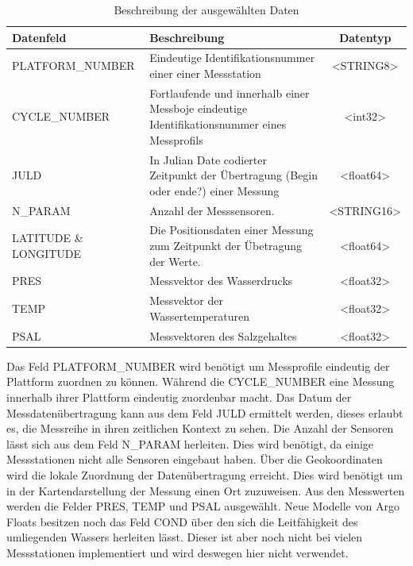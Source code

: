 \begin{center}
\begin{table}
  
  \begin{tabular}{ | l | p{7cm}| c |}
    \hline
    \textbf{Datenfeld} & \textbf{Beschreibung} & \textbf{Datentyp} \\\hline
   
    PLATFORM\_NUMBER 
        &  Eindeutige Identifikationsnummer einer einer Messstation
        & <STRING8>
        \\\hline 
    
    CYCLE\_NUMBER 
        &  Fortlaufende und innerhalb einer Messboje eindeutige Identifikationsnummer eines Messprofils
        & <int32>
        \\\hline
    
    JULD
        & In Julian Date codierter Zeitpunkt der Übertragung (Begin oder ende?) einer Messung
        & <float64>
       \\\hline
        
    N\_PARAM
        & Anzahl der Messsensoren. 
        & <STRING16>
        \\\hline
        
    LATITUDE \& LONGITUDE
        & Die Positionsdaten einer Messung zum Zeitpunkt der Übetragung der Werte.
        & <float64>
        \\\hline
        
    PRES
        & Messvektor des Wasserdrucks
        & <float32>
        \\\hline
        
    TEMP
        & Messvektor der Wassertemperaturen 
        & <float32>
          \\\hline
        
    PSAL
        & Messvektoren des Salzgehaltes
        & <float32>
         \\\hline
    \end{tabular}
      \caption{Beschreibung der ausgewählten Daten}
      \label{table:Datenauswahl}
\end{table}
\end{center}

Das Feld PLATFORM\_NUMBER wird benötigt um Messprofile eindeutig der Plattform zuordnen zu können. Während die CYCLE\_NUMBER eine Messung innerhalb ihrer Plattform eindeutig zuordenbar macht. Das Datum der Messdatenübertragung kann aus dem Feld JULD ermittelt werden, dieses erlaubt es, die Messreihe in ihren zeitlichen Kontext zu sehen. Die Anzahl der Sensoren lässt sich aus dem Feld N\_PARAM herleiten. Dies wird benötigt, da einige Messstationen nicht alle Sensoren eingebaut haben. Über die Geokoordinaten wird die lokale Zuordnung der Datenübertragung erreicht. Dies wird benötigt um in der Kartendarstellung der Messung einen Ort zuzuweisen.
Aus den Messwerten werden die Felder PRES, TEMP und PSAL ausgewählt. Neue Modelle von Argo Floats besitzen noch das Feld COND über den sich die Leitfähigkeit des umliegenden Wassers herleiten lässt. Dieser ist aber noch nicht bei vielen Messstationen implementiert und wird deswegen hier nicht verwendet.


